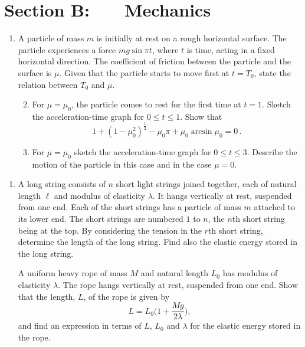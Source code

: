 \documentclass[a4, 11pt]{report}
\newlength{\qspace}
\newcounter{qnumber}
\newenvironment{question}%
 {\vspace{\qspace}
  \begin{enumerate}[\bfseries 1\quad][10]%
    \setcounter{enumi}{\value{qnumber}}%
    \item%
 }
{
  \end{enumerate}
  \filbreak
  \stepcounter{qnumber}
 }
\newenvironment{questionparts}[1][1]%
 {
  \begin{enumerate}[\bfseries (i)]%
    \setcounter{enumii}{#1}
    \addtocounter{enumii}{-1}
    \setlength{\itemsep}{5mm}
    \setlength{\parskip}{8pt}
 }
 {
  \end{enumerate}
 }
\def\le{\leqslant}
\begin{document}
		
	
\newpage
\section*{Section B: \ \ \ Mechanics}


	
\begin{question}
A particle of mass $m$  is initially at rest 
on a rough horizontal surface. The particle experiences a force 
$mg\sin \pi t$, where $t$ is time, acting  in 
a fixed horizontal direction. 
The coefficient of  friction between the particle and the surface is $\mu$. 
Given that the particle starts to 
move first at $t=T_0$,  state the relation between
$T_0$ and $\mu$.

\begin{questionparts}
\item For $\mu = \mu_0$, 
the particle comes to rest for the first time at $t=1$.
Sketch the acceleration-time graph for $0\le t \le 1$. Show that
\[
1+\left(1-\mu_0^2\right)^{\frac12}
 -\mu_0\pi +\mu_0 \arcsin \mu_0 =0\,. 
\]

\item For $\mu=\mu_0$
sketch the acceleration-time graph for $0\le t\le 3$.
Describe the motion of the particle in this case and in the case $\mu=0$.
\end{questionparts}

	\end{question}
	
\begin{question}	
A long string consists of $n$ short
light strings joined together, each of natural length
$\ell$ and modulus of elasticity $\lambda$. 
It hangs vertically at rest, suspended from one end.
Each of the short strings has a particle of mass $m$ attached to its lower
end.  The short strings are numbered $1$ to $n$, the $n$th short
string  being at the top. By considering the tension in the $r$th
short string, determine the length
of the long string. Find also the elastic energy stored in the long string.


A uniform heavy rope of mass $M$ and natural length $L_0$
has modulus of elasticity $\lambda$.
The rope hangs vertically at rest, suspended from one end. 
Show that the length, $L$,  of the rope  is given by
\[
L=L_0\biggl(1+ \frac{Mg}{2\lambda}\biggr),
\]
and find an expression in  terms of $L$, $L_0$ and $\lambda$ for the 
elastic energy stored in the rope.
\end{question}
\end{document}
